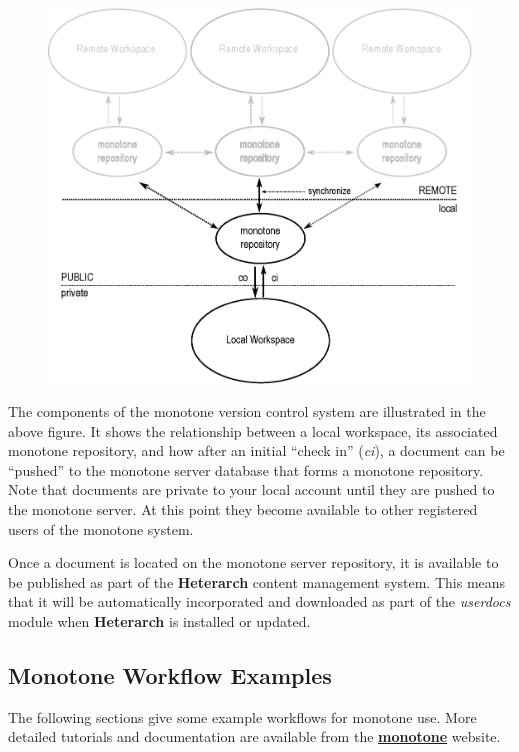 \documentclass[12pt]{article}
\begin{document}
\begin{figure}[h]
  \centering
 \includegraphics[scale=0.6]{figures/heterarch-monotone.eps}
  \label{fig:monotone}
\end{figure}

The components of the monotone version control system are illustrated in the above figure. It shows the relationship between a local workspace, its associated monotone repository, and how after an initial ``check in'' ({\it ci}), a document can be ``pushed'' to the monotone server database that forms a monotone repository. Note that documents are private to your local account until they are pushed to the monotone server. At this point they become available to other registered users of the monotone system.

Once a document is located on the monotone server repository, it is available to be published as part of the {\bf\small{Heterarch}} content management system. This means that it will be automatically incorporated and downloaded as part of the {\it userdocs} module when {\bf\small{Heterarch}} is installed or updated.

\subsection*{Monotone Workflow Examples}

The following sections give some example workflows for monotone use. More detailed tutorials and documentation are available from the \href{http://www.monotone.ca/docs/index.html}{\bf monotone} website.
\end{document}
